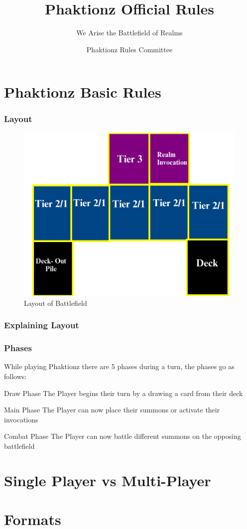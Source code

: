 \documentclass{beamer}
\title[Phaktionz Official Rules] %
{Phaktionz Official Rules}
\subtitle{We Arise the Battlefield of Realms}
\author[Phaktionz Rules Committee] %
{Phaktionz Rules Committee}
\institute[] %
{\inst{Casual Card Cafe}}
\date[] %
\begin{document}
\frame{\titlepage}


\section{Phaktionz Basic Rules}
\begin{frame}
    \frametitle{Layout}
    \begin{figure}
        \includegraphics[scale=0.22]{images/field.png}
        \caption{\textrm{Layout of Battlefield}}
    \end{figure}
\end{frame}

\begin{frame}
    \frametitle{Explaining Layout}

    

\end{frame}



\begin{frame}
    \frametitle{Phases}
    \textrm{While playing Phaktionz there are 5 phases during a turn, the phases go as follows:} 
    \begin{alertblock}{Draw Phase}
        \textrm{The Player begins their turn by a drawing a card from their deck}
    \end{alertblock}
    \begin{alertblock}{Main Phase}
       \textrm{The Player can now place their summons or activate their invocations}
    \end{alertblock}
    \begin{alertblock}{Combat Phase}
        \textrm{The Player can now battle different summons on the opposing battlefield}
    \end{alertblock}

\end{frame}




\section{Single Player vs Multi-Player}





\section{Formats}
\end{document}
